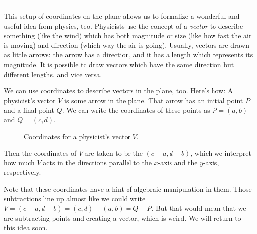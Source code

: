 \documentclass[00-livre-main.tex]{subfiles}
\begin{document}
\vspace{.5cm}
\hrule
\vspace{.5cm}

This setup of coordinates on the plane allows us to formalize a wonderful and useful idea from physics, too. 
Physicists use the concept of a \emph{vector} to describe something (like the wind) which has both magnitude or size (like how fast the air is moving)  and direction (which way the air is going).
Usually, vectors are drawn as little arrows: the arrow has a direction, and it has a length which represents its magnitude.
It is possible to draw vectors which have the same direction but different lengths, and vice versa.

We can use coordinates to describe vectors in the plane, too. 
Here's how: A physicist's vector $V$ is some arrow in the plane.
That arrow has an initial point $P$ and a final point $Q$.
We can write the coordinates of these points as $P = (a,b)$ and $Q = (c,d)$.

\begin{figure}[h]
\centering
{}
\caption{Coordinates for a physicist's vector $V$.}
\end{figure}


Then the coordinates of $V$ are taken to be the $(c-a, d-b)$, which we interpret how much $V$ acts in the directions parallel to the $x$-axis and the $y$-axis, respectively.


Note that these coordinates have a hint of algebraic manipulation in them. 
Those subtractions line up almost like we could write $V =(c-a,d-b) = (c,d)-(a,b) = Q-P$. 
But that would mean that we are subtracting points and creating a vector, which is weird.
We will return to this idea soon.
\end{document}

